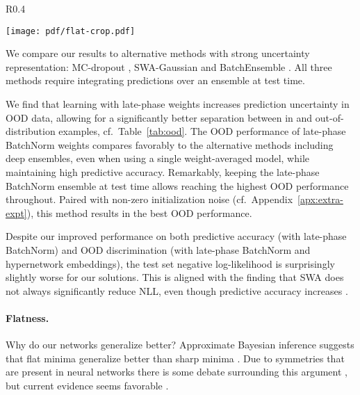 \documentclass{article} \usepackage{iclr2021_conference,times}
\begin{document}
\begin{wrapfigure}[13]{R}{0.4\textwidth}
  \vspace{-19pt}
  \begin{center}
    \texttt{[image: pdf/flat-crop.pdf]}
  \end{center}
  \vspace{-14pt}
\end{wrapfigure}
We compare our results to alternative methods with strong uncertainty representation: MC-dropout \citep{gal_dropout_2016}, SWA-Gaussian \citep[SWAG;][]{maddox_simple_2019} and BatchEnsemble \citep{wen_batchensemble_2020}. All three methods require integrating predictions over an ensemble at test time.

We find that learning with late-phase weights increases prediction uncertainty in OOD data, allowing for a significantly better separation between in and out-of-distribution examples, cf.~Table~\ref{tab:ood}. The OOD performance of late-phase BatchNorm weights compares favorably to the alternative methods including deep ensembles, even when using a single weight-averaged model, while maintaining high predictive accuracy. Remarkably, keeping the late-phase BatchNorm ensemble at test time allows reaching the highest OOD performance throughout. Paired with non-zero initialization noise  (cf.~Appendix~\ref{apx:extra-expt}), this method results in the best OOD performance.

Despite our improved performance on both predictive accuracy (with late-phase BatchNorm) and OOD discrimination (with late-phase BatchNorm and hypernetwork embeddings), the test set negative log-likelihood \citep[NLL; often used to assess predictive uncertainty,][]{guo_calibration_2017} is surprisingly slightly worse for our solutions. This is aligned with the finding that SWA does not always significantly reduce NLL, even though predictive accuracy increases \citep{maddox_simple_2019}.



\paragraph{Flatness.} Why do our networks generalize better? Approximate Bayesian inference suggests that flat minima generalize better than sharp minima \citep{hochreiter_flat_1997,mackay_practical_1992}. Due to symmetries that are present in neural networks there is some debate surrounding this argument \citep{dinh_sharp_2017}, but current evidence seems favorable \citep[][]{jiang_fantastic_2020}.
\end{document}
